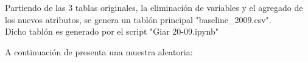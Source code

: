 Partiendo de las 3 tablas originales, la eliminación de variables y el agregado de los nuevos atributos, se genera un tablón principal "baseline\_2009.csv". \\
Dicho tablón es generado por el script "Giar 20-09.ipynb"

A continuación de presenta una muestra aleatoria:


